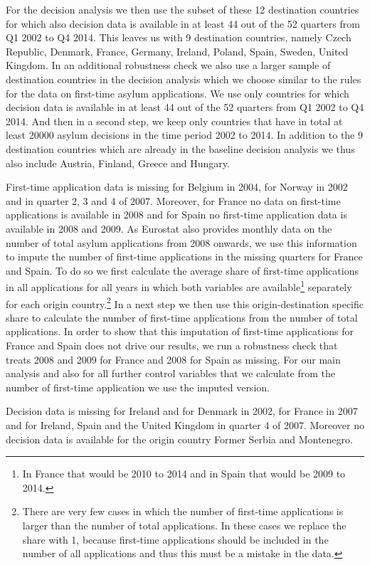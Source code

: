 \documentclass[11pt,a4paper]{scrartcl}
\begin{document}
For the decision analysis we then use the subset of these 12 destination countries for which also decision data is available in at least 44 out of the 52 quarters from Q1 2002 to Q4 2014. This leaves us with 9 destination countries, namely Czech Republic, Denmark, France, Germany, Ireland, Poland, Spain, Sweden, United Kingdom. In an additional robustness check we also use a larger sample of destination countries in the decision analysis which we choose similar to the rules for the data on first-time asylum applications. We use only countries for which decision data is available in at least 44 out of the 52 quarters from Q1 2002 to Q4 2014. And then in a second step, we keep only countries that have in total at least 20000 asylum decisions in the time period 2002 to 2014. In addition to the 9 destination countries which are already in the baseline decision analysis we thus also include Austria, Finland, Greece and Hungary. 

First-time application data is missing for Belgium in 2004, for Norway in 2002 and in quarter 2, 3 and 4 of 2007. Moreover, for France no data on first-time applications is available in 2008 and for Spain no first-time application data is available in 2008 and 2009. As Eurostat also provides monthly data on the number of total asylum applications from 2008 onwards, we use this information to impute the number of first-time applications in the missing quarters for France and Spain. To do so we first calculate the average share of first-time applications in all applications for all years in which both variables are available\footnote{In France that would be 2010 to 2014 and in Spain that would be 2009 to 2014.} separately for each origin country.\footnote{There are very few cases in which the number of first-time applications is larger than the number of total applications. In these cases we replace the share with 1, because first-time applications should be included in the number of all applications and thus this must be a mistake in the data.} In a next step we then use this origin-destination specific share to calculate the number of first-time applications from the number of total applications. In order to show that this imputation of first-time applications for France and Spain does not drive our results, we run a robustness check that treats 2008 and 2009 for France and 2008 for Spain as missing. For our main analysis and also for all further control variables that we calculate from the number of first-time application we use the imputed version. 

Decision data is missing for Ireland and for Denmark in 2002, for France in 2007 and for Ireland, Spain and the United Kingdom in quarter 4 of 2007. Moreover no decision data is available for the origin country Former Serbia and Montenegro.   
\end{document}
